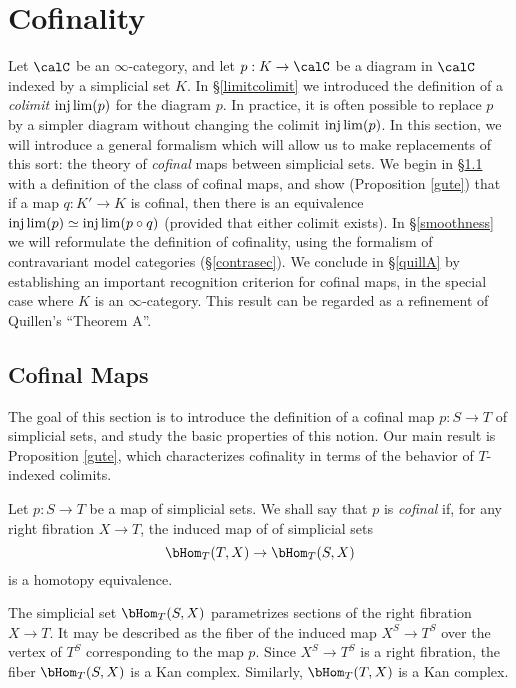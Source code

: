  \section{Cofinality}\label{chap3cofinal}
 
 
\setcounter{theorem}{0}


Let $\calC$ be an $\infty$-category, and let $p: K \rightarrow \calC$ be a diagram in $\calC$ indexed by a simplicial set $K$. In \S \ref{limitcolimit} we introduced the definition of a {\em colimit} $\injlim(p)$ for the diagram $p$. In practice, it is often possible to replace $p$ by a simpler diagram without changing the colimit $\injlim(p)$. In this section, we will introduce a general formalism which will allow us to make replacements of this sort: the theory of {\em cofinal} maps between simplicial sets. We begin in \S \ref{cofinal} with a definition of the class of cofinal maps, and show (Proposition \ref{gute}) that if a map $q: K' \rightarrow K$ is cofinal, then there is an equivalence
$\injlim(p) \simeq \injlim(p \circ q)$ (provided that either colimit exists). In \S \ref{smoothness} we will reformulate the definition of cofinality, using the formalism of contravariant model categories (\S \ref{contrasec}). We conclude in \S \ref{quillA} by establishing an important recognition criterion for cofinal maps, in the special case where $K$ is an $\infty$-category. This result can be regarded as a refinement of Quillen's ``Theorem A''. 
 
\subsection{Cofinal Maps}\label{cofinal}

The goal of this section is to introduce the definition of a cofinal map $p: S \rightarrow T$ of simplicial sets, and study the basic properties of this notion. Our main result is Proposition \ref{gute}, which characterizes cofinality in terms of the behavior of $T$-indexed colimits.

\begin{definition}
Let $p: S \rightarrow T$ be a map of simplicial sets. We shall
say that $p$ is {\it cofinal} if, for any right fibration $X
\rightarrow T$, the induced map of of simplicial sets
$$ \bHom_{T}(T,X) \rightarrow \bHom_{T}(S, X)$$
is a homotopy equivalence.
\end{definition}

\begin{remark}
The simplicial set $\bHom_{T}(S,X)$ parametrizes sections of the right fibration $X \rightarrow T$.
It may be described as the fiber of the induced map $X^{S} \rightarrow T^{S}$ over the vertex of $T^S$ corresponding to the map $p$. Since $X^{S} \rightarrow T^{S}$ is a right fibration, the fiber $\bHom_{T}(S,X)$ is a Kan complex. Similarly, $\bHom_{T}(T,X)$ is a Kan complex.
\end{remark}

